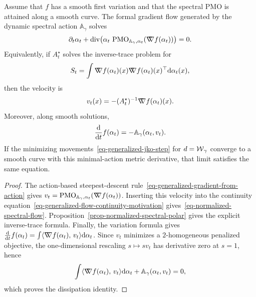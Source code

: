 \begin{prop}\label{prop-normalized-spectral-gradient-flow}
	Assume that $f$ has a smooth first variation and that the spectral PMO is attained along a smooth curve. The formal gradient flow generated by the dynamic spectral action $\mathbb A_\gamma$ solves
	\begin{equation}\label{eq-normalized-spectral-flow}
		\partial_t\alpha_t
		+
		\operatorname{div}\!\left(
		\alpha_t\,\operatorname{PMO}_{\mathbb A_\gamma,\alpha_t}(\mathord{\nabla\mkern-9.3mu\nabla} f(\alpha_t))
		\right)=0.
	\end{equation}
	Equivalently, if $A_t^\star$ solves the inverse-trace problem for
	\[
		S_t=\int \mathord{\nabla\mkern-9.3mu\nabla} f(\alpha_t)(x)\mathord{\nabla\mkern-9.3mu\nabla} f(\alpha_t)(x)^\top\mathrm{d}\alpha_t(x),
	\]
	then the velocity is
	\[
		v_t(x)=-(A_t^\star)^{-1}\mathord{\nabla\mkern-9.3mu\nabla} f(\alpha_t)(x).
	\]
	Moreover, along smooth solutions,
	\[
		\frac{\mathrm{d}}{\mathrm{d} t}f(\alpha_t)
		=
		-\mathbb A_\gamma(\alpha_t,v_t).
	\]
	If the minimizing movements~\eqref{eq-generalized-jko-step} for $d=\operatorname{\mathcal{W}}_\gamma$ converge to a smooth curve with this minimal-action metric derivative, that limit satisfies the same equation.
\end{prop}
\begin{proof}
	The action-based steepest-descent rule~\eqref{eq-generalized-gradient-from-action} gives
	\(
	 v_t=\operatorname{PMO}_{\mathbb A_\gamma,\alpha_t}(\mathord{\nabla\mkern-9.3mu\nabla} f(\alpha_t))
	\).
	Inserting this velocity into the continuity equation~\eqref{eq-generalized-flow-continuity-motivation} gives~\eqref{eq-normalized-spectral-flow}. Proposition~\ref{prop-normalized-spectral-polar} gives the explicit inverse-trace formula.
	Finally, the variation formula gives $\frac{\mathrm{d}}{\mathrm{d} t}f(\alpha_t)=\int\langle \mathord{\nabla\mkern-9.3mu\nabla} f(\alpha_t),\,v_t\rangle\mathrm{d}\alpha_t$. Since $v_t$ minimizes a $2$-homogeneous penalized objective, the one-dimensional rescaling $s\mapsto sv_t$ has derivative zero at $s=1$, hence
	\[
		\int\langle \mathord{\nabla\mkern-9.3mu\nabla} f(\alpha_t),\,v_t\rangle\mathrm{d}\alpha_t
		+
		\mathbb A_\gamma(\alpha_t,v_t)
		=0,
	\]
	which proves the dissipation identity.
\end{proof}

